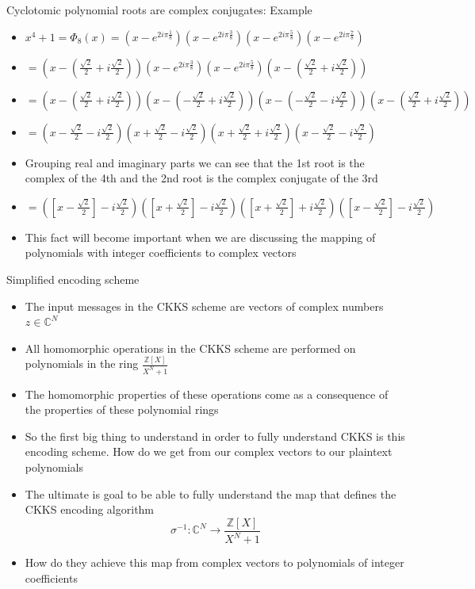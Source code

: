 \documentclass{beamer}
\begin{document}
\begin{frame}{Cyclotomic polynomial roots are complex conjugates: Example}
	\begin{itemize}[<+->]
		\item $x^4 + 1 = \Phi_8(x) = (x - e^{2i \pi \frac{1}{8}})(x - e^{2i \pi \frac{3}{8}})(x - e^{2i \pi \frac{5}{8}})(x - e^{2i \pi \frac{7}{8}})$
		\item $ = (x - (\frac{\sqrt{2}}{2} + i\frac{\sqrt{2}}{2}))(x - e^{2i \pi \frac{3}{8}})(x - e^{2i \pi \frac{5}{8}})(x - (\frac{\sqrt{2}}{2} + i\frac{\sqrt{2}}{2}))$
		\item $ = (x - (\frac{\sqrt{2}}{2} + i\frac{\sqrt{2}}{2}))(x - (-\frac{\sqrt{2}}{2} + i\frac{\sqrt{2}}{2}))(x - (-\frac{\sqrt{2}}{2} - i\frac{\sqrt{2}}{2}))(x - (\frac{\sqrt{2}}{2} + i\frac{\sqrt{2}}{2}))$
		\item $ = (x -\frac{\sqrt{2}}{2} - i\frac{\sqrt{2}}{2})(x +\frac{\sqrt{2}}{2} - i\frac{\sqrt{2}}{2})(x +\frac{\sqrt{2}}{2} + i\frac{\sqrt{2}}{2})(x -\frac{\sqrt{2}}{2} - i\frac{\sqrt{2}}{2})$
		\item Grouping real and imaginary parts we can see that the 1st root is the complex of the 4th 
		and the 2nd root is the complex conjugate of the 3rd
		\item $= ([x -\frac{\sqrt{2}}{2}] - i\frac{\sqrt{2}}{2})([x +\frac{\sqrt{2}}{2}] - i\frac{\sqrt{2}}{2})([x +\frac{\sqrt{2}}{2}] + i\frac{\sqrt{2}}{2})([x -\frac{\sqrt{2}}{2}] - i\frac{\sqrt{2}}{2})$
		\item This fact will become important when we are discussing the mapping of polynomials with integer
		coefficients to complex vectors
	\end{itemize}
\end{frame}

\begin{frame}{Simplified encoding scheme}
	\begin{itemize}[<+->]
		\item The input messages in the CKKS scheme are vectors of complex numbers $z \in \mathbb{C}^N$
		\item All homomorphic operations in the CKKS scheme are performed on polynomials in the ring
		$\frac{\mathbb{Z}[X]}{X^N + 1}$
		\item The homomorphic properties of these operations come as a consequence
		of the properties of these polynomial rings
		\item So the first big thing to understand in order to fully understand CKKS is this encoding
		scheme. How do we get from our complex vectors to our plaintext polynomials
		\item The ultimate is goal to be able to fully understand the map that defines the CKKS encoding algorithm
		$$\sigma^{-1} : \mathbb{C}^N \to \frac{\mathbb{Z}[X]}{X^N + 1}$$
		\item How do they achieve this map from complex vectors to polynomials of integer coefficients

	\end{itemize}
\end{frame}
\end{document}
